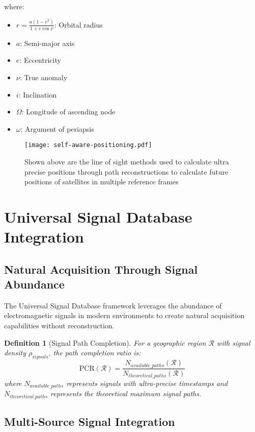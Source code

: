 \documentclass[12pt,a4paper]{article}
\newtheorem{definition}[theorem]{Definition}
\begin{document}
where:
\begin{itemize}
\item $r = \frac{a(1-e^2)}{1+e\cos\nu}$: Orbital radius
\item $a$: Semi-major axis
\item $e$: Eccentricity  
\item $\nu$: True anomaly
\item $i$: Inclination
\item $\Omega$: Longitude of ascending node
\item $\omega$: Argument of periapsis
\end{itemize}

\begin{figure}[H]
\centering
\texttt{[image: self-aware-positioning.pdf]}
\caption{Shown above are the line of sight methods used to calculate ultra precise positions through path reconstructions to calculate future positions of satellites in multiple reference frames}
\label{fig:self-aware-positioning}
\end{figure}

\section{Universal Signal Database Integration}

\subsection{Natural Acquisition Through Signal Abundance}

The Universal Signal Database framework leverages the abundance of electromagnetic signals in modern environments to create natural acquisition capabilities without reconstruction.

\begin{definition}[Signal Path Completion]
For a geographic region $\mathcal{R}$ with signal density $\rho_{signals}$, the path completion ratio is:
\begin{equation}
\text{PCR}(\mathcal{R}) = \frac{N_{available\_paths}(\mathcal{R})}{N_{theoretical\_paths}(\mathcal{R})}
\end{equation}
where $N_{available\_paths}$ represents signals with ultra-precise timestamps and $N_{theoretical\_paths}$ represents the theoretical maximum signal paths.
\end{definition}

\subsection{Multi-Source Signal Integration}
\end{document}
